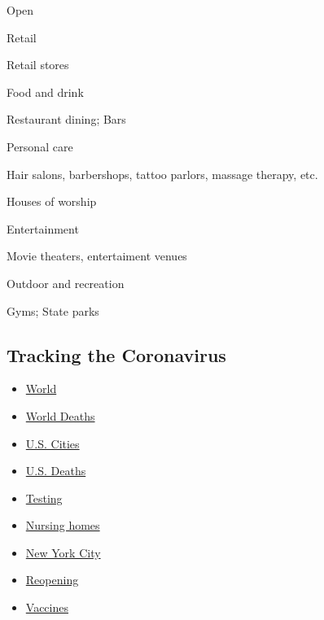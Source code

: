 Open

Retail

Retail stores

Food and drink

Restaurant dining; Bars

Personal care

Hair salons, barbershops, tattoo parlors, massage therapy, etc.

Houses of worship

Entertainment

Movie theaters, entertaiment venues

Outdoor and recreation

Gyms; State parks

\hypertarget{tracking-the-coronavirus}{%
\subsection{Tracking the Coronavirus}\label{tracking-the-coronavirus}}

\begin{itemize}
\tightlist
\item
  \href{https://www.nytimes3xbfgragh.onion/interactive/2020/world/coronavirus-maps.html}{World}
\item
  \href{https://www.nytimes3xbfgragh.onion/interactive/2020/04/21/world/coronavirus-missing-deaths.html}{World
  Deaths}
\item
  \href{https://www.nytimes3xbfgragh.onion/interactive/2020/04/23/upshot/five-ways-to-monitor-coronavirus-outbreak-us.html}{U.S.
  Cities}
\item
  \href{https://www.nytimes3xbfgragh.onion/interactive/2020/05/05/us/coronavirus-death-toll-us.html}{U.S.
  Deaths}
\item
  \href{https://www.nytimes3xbfgragh.onion/interactive/2020/us/coronavirus-testing.html}{Testing}
\item
  \href{https://www.nytimes3xbfgragh.onion/interactive/2020/us/coronavirus-nursing-homes.html}{Nursing
  homes}
\item
  \href{https://www.nytimes3xbfgragh.onion/interactive/2020/nyregion/new-york-city-coronavirus-cases.html}{New
  York City}
\item
  \href{https://www.nytimes3xbfgragh.onion/interactive/2020/us/states-reopen-map-coronavirus.html}{Reopening}
\item
  \href{https://www.nytimes3xbfgragh.onion/interactive/2020/science/coronavirus-vaccine-tracker.html}{Vaccines}
\end{itemize}

